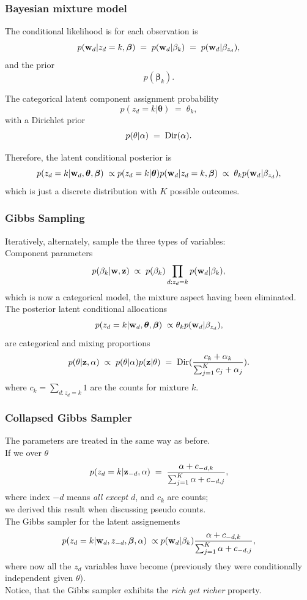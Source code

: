 \begin{frame}
\frametitle{Bayesian mixture model}

The conditional likelihood is for each observation is
\[
p({\bf w}_d|z_d=k,\boldsymbol\beta)\;=\;p({\bf
  w}_d|\beta_k)\;=\;p({\bf w}_d|\beta_{z_d}),
\]
and the prior
\[
p(\boldsymbol\beta_k).
\]

The categorical latent component assignment probability
\[
p(z_d=k|\boldsymbol\theta)\;=\;\theta_k,
\]
with a Dirichlet prior
\[
p(\theta|\alpha)\;=\;{\rm Dir}(\alpha).
\]

Therefore, the latent conditional posterior is
\[
p(z_d=k|{\bf w}_d,\boldsymbol\theta,\boldsymbol\beta)\;\propto
p(z_d=k|\boldsymbol\theta)p({\bf w}_d|z_d=k,\boldsymbol\beta)\;\propto\;
\theta_k p({\bf w}_d|\beta_{z_d}),
\]
which is just a discrete distribution with $K$ possible outcomes.
\end{frame}


\begin{frame}
\frametitle{Gibbs Sampling}

Iteratively, alternately, sample the three types of variables:\\[1ex]

Component parameters
\[
p(\beta_k|{\bf w},{\bf z})\;\propto\;p(\beta_k)\prod_{d:z_d=k}p({\bf w}_d|\beta_k),
\]
which is now a categorical model, the mixture aspect having been eliminated.\\[1ex]

The posterior latent conditional allocations
\[
p(z_d=k|{\bf w}_d,\boldsymbol\theta,\boldsymbol\beta)\;\propto \theta_k
p({\bf w}_d|\beta_{z_d}),
\]
are categorical and mixing proportions
\[
p(\theta|{\bf z},\alpha)\;\propto\;p(\theta|\alpha)p({\bf z}|\theta)\;=\;
{\rm Dir}(\frac{c_k+\alpha_k}{\sum_{j=1}^K c_j+\alpha_j}).
\]
where $c_k=\sum_{d:z_d=k}1$ are the counts for mixture $k$.
\end{frame}

\begin{frame}
\frametitle{Collapsed Gibbs Sampler}

The parameters are treated in the same way as before.\\[1ex]

If we  over $\theta$
\[
p(z_d=k|{\bf z}_{-d},\alpha)\;=\;\frac{\alpha+c_{-d,k}}{\sum_{j=1}^K\alpha+c_{-d,j}},
\]
where index $-d$ means \emph{all except} $d$, and $c_k$ are counts;\\
we derived this result when discussing pseudo counts.\\[1ex]

The  Gibbs sampler for the latent assignements
\[
p(z_d=k|{\bf w}_d,z_{-d},\boldsymbol\beta,\alpha)\;\propto
p({\bf w}_d|\beta_k)\frac{\alpha+c_{-d,k}}{\sum_{j=1}^K\alpha+c_{-d,j}},
\]
where now all the $z_d$ variables have become  (previously
they were conditionally independent given $\theta$).\\[1ex]

Notice, that the Gibbs sampler exhibits the \emph{rich get richer} property.
\end{frame}

